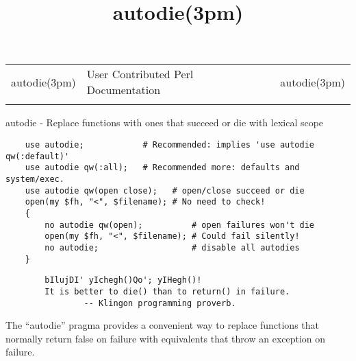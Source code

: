 \documentclass[]{article}
\title{autodie(3pm)}
\author{}
\date{}
\begin{document}
\maketitle

\begin{longtable}[c]{@{}lll@{}}
\toprule\addlinespace
autodie(3pm) & User Contributed Perl Documentation & autodie(3pm)
\\\addlinespace
\bottomrule
\end{longtable}


autodie - Replace functions with ones that succeed or die with lexical
scope


\begin{verbatim}
    use autodie;            # Recommended: implies 'use autodie qw(:default)'
    use autodie qw(:all);   # Recommended more: defaults and system/exec.
    use autodie qw(open close);   # open/close succeed or die
    open(my $fh, "<", $filename); # No need to check!
    {
        no autodie qw(open);          # open failures won't die
        open(my $fh, "<", $filename); # Could fail silently!
        no autodie;                   # disable all autodies
    }
\end{verbatim}


\begin{verbatim}
        bIlujDI' yIchegh()Qo'; yIHegh()!
        It is better to die() than to return() in failure.
                -- Klingon programming proverb.
\end{verbatim}

The ``autodie'' pragma provides a convenient way to replace functions
that normally return false on failure with equivalents that throw an
exception on failure.
\end{document}
